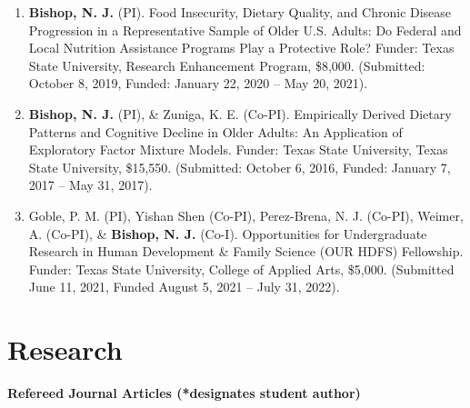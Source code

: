 \documentclass[
]{article}
\begin{document}
\begin{enumerate}
\def\labelenumi{\arabic{enumi}.}
\item
  \textbf{Bishop, N. J.} (PI). Food Insecurity, Dietary Quality, and
  Chronic Disease Progression in a Representative Sample of Older U.S.
  Adults: Do Federal and Local Nutrition Assistance Programs Play a
  Protective Role? Funder: Texas State University, Research Enhancement
  Program, \$8,000. (Submitted: October 8, 2019, Funded: January 22,
  2020 -- May 20, 2021).
\item
  \textbf{Bishop, N. J.} (PI), \& Zuniga, K. E. (Co-PI). Empirically
  Derived Dietary Patterns and Cognitive Decline in Older Adults: An
  Application of Exploratory Factor Mixture Models. Funder: Texas State
  University, Texas State University, \$15,550. (Submitted: October 6,
  2016, Funded: January 7, 2017 -- May 31, 2017).
\item
  Goble, P. M. (PI), Yishan Shen (Co-PI), Perez-Brena, N. J. (Co-PI),
  Weimer, A. (Co-PI), \& \textbf{Bishop, N. J.} (Co-I). Opportunities
  for Undergraduate Research in Human Development \& Family Science (OUR
  HDFS) Fellowship. Funder: Texas State University, College of Applied
  Arts, \$5,000. (Submitted June 11, 2021, Funded August 5, 2021 -- July
  31, 2022).
\end{enumerate}

\hypertarget{research}{%
\section{\texorpdfstring{\textbf{Research}}{Research}}\label{research}}

\textbf{Refereed Journal Articles (*designates student author)}
\end{document}
